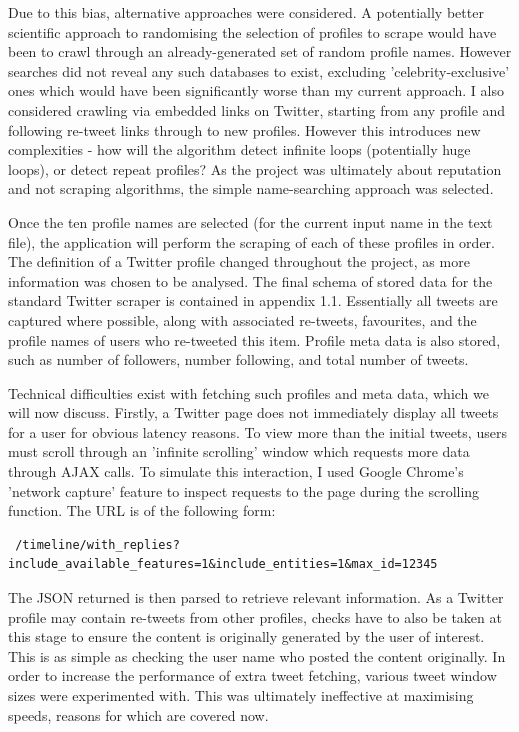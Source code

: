 Due to this bias, alternative approaches were considered. A potentially better scientific approach to randomising the selection of profiles to scrape would have been to crawl through an already-generated set of random profile names. However searches did not reveal any such databases to exist, excluding 'celebrity-exclusive' ones which would have been significantly worse than my current approach. I also considered crawling via embedded links on Twitter, starting from any profile and following re-tweet links through to new profiles. However this introduces new complexities - how will the algorithm detect infinite loops (potentially huge loops), or detect repeat profiles? As the project was ultimately about reputation and not scraping algorithms, the simple name-searching approach was selected. 

Once the ten profile names are selected (for the current input name in the text file), the application will perform the scraping of each of these profiles in order.  The definition of a Twitter profile changed throughout the project, as more information was chosen to be analysed. The final schema of stored data for the standard Twitter scraper is contained in appendix 1.1. Essentially all tweets are captured where possible, along with associated re-tweets, favourites, and the profile names of users who re-tweeted this item. Profile meta data is also stored, such as number of followers, number following, and total number of tweets. 

Technical difficulties exist with fetching such profiles and meta data, which we will now discuss. Firstly, a Twitter page does not immediately display all tweets for a user for obvious latency reasons. To view more than the initial tweets, users must scroll through an 'infinite scrolling' window which requests more data through AJAX calls. To simulate this interaction, I used Google Chrome's 'network capture' feature to inspect requests to the page during the scrolling function. The URL is of the following form:

\begin{verbatim}
 /timeline/with_replies?include_available_features=1&include_entities=1&max_id=12345
\end{verbatim}

\noindent The JSON returned is then parsed to retrieve relevant information. As a Twitter profile may contain re-tweets from other profiles, checks have to also be taken at this stage to ensure the content is originally generated by the user of interest. This is as simple as checking the user name who posted the content originally. In order to increase the performance of extra tweet fetching, various tweet window sizes were experimented with. This was ultimately ineffective at maximising speeds, reasons for which are covered now.

